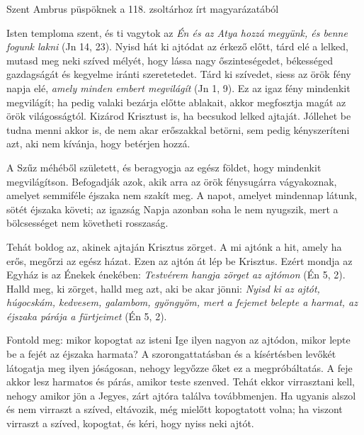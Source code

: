 \documentclass[twoside]{article}
\begin{document}


Szent Ambrus püspöknek a 118. zsoltárhoz írt magyarázatából

{\centering{}}

\begin{lectio}{Isten temploma szent, és ti vagytok az}
\noindent \textit{Én és az Atya hozzá megyünk, és benne fogunk lakni} (Jn 14, 23). Nyisd hát ki ajtódat az érkező előtt, tárd elé a lelked, mutasd meg neki szíved mélyét, hogy lássa nagy őszinteségedet, békességed gazdagságát és kegyelme iránti szeretetedet. Tárd ki szívedet, siess az örök fény napja elé, \textit{amely minden embert megvilágít} (Jn 1, 9). Ez az igaz fény mindenkit megvilágít; ha pedig valaki bezárja előtte ablakait, akkor megfosztja magát az örök világosságtól. Kizárod Krisztust is, ha becsukod lelked ajtaját. Jóllehet be tudna menni akkor is, de nem akar erőszakkal betörni, sem pedig kényszeríteni azt, aki nem kívánja, hogy betérjen hozzá.

A Szűz méhéből született, és beragyogja az egész földet, hogy mindenkit megvilágítson. Befogadják azok, akik arra az örök fénysugárra vágyakoznak, amelyet semmiféle éjszaka nem szakít meg. A napot, amelyet mindennap látunk, sötét éjszaka követi; az igazság Napja azonban soha le nem nyugszik, mert a bölcsességet nem követheti rosszaság.

Tehát boldog az, akinek ajtaján Krisztus zörget. A mi ajtónk a hit, amely ha erős, megőrzi az egész házat. Ezen az ajtón át lép be Krisztus. Ezért mondja az Egyház is az Énekek énekében: \textit{Testvérem hangja zörget az ajtómon} (Én 5, 2). Halld meg, ki zörget, halld meg azt, aki be akar jönni: \textit{Nyisd ki az ajtót, húgocskám, kedvesem, galambom, gyöngyöm, mert a fejemet belepte a harmat, az éjszaka párája a fürtjeimet} (Én 5, 2).

Fontold meg: mikor kopogtat az isteni Ige ilyen nagyon az ajtódon, mikor lepte be a fejét az éjszaka harmata? A szorongattatásban és a kísértésben levőkét látogatja meg ilyen jóságosan, nehogy legyőzze őket ez a megpróbáltatás. A feje akkor lesz harmatos és párás, amikor teste szenved. Tehát ekkor virrasztani kell, nehogy amikor jön a Jegyes, zárt ajtóra találva továbbmenjen. Ha ugyanis alszol és nem virraszt a szíved, eltávozik, még mielőtt kopogtatott volna; ha viszont virraszt a szíved, kopogtat, és kéri, hogy nyiss neki ajtót.


\end{lectio}
\end{document}

